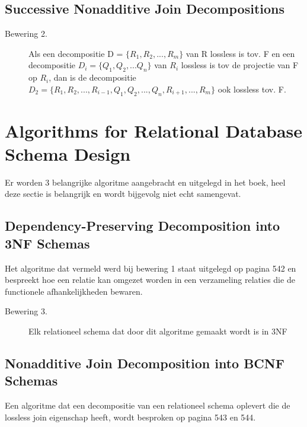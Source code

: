 				\subsection{Successive Nonadditive Join Decompositions}
				
					\begin{description}
						\item[Bewering 2. ] Als een decompositie D = $\lbrace R_1, R_2, ..., R_m \rbrace$ van R lossless is tov. F en een decompositie $D_i = \lbrace Q_1, Q_2, ... Q_n 								\rbrace$ van $R_i$ lossless is tov de projectie van F op $R_i$, dan is de decompositie $D_2 = \lbrace R_1, R_2, ..., R_{i-1}, Q_1, Q_2, ..., Q_n, R_{i+1}, ..., R_m 							\rbrace$ ook lossless tov. F.
					\end{description}
					
			\section{Algorithms for Relational Database Schema Design}
			
				Er worden 3 belangrijke algoritme aangebracht en uitgelegd in het boek, heel deze sectie is belangrijk en wordt bijgevolg niet echt samengevat.
			
				\subsection{Dependency-Preserving Decomposition into 3NF Schemas}
				
					Het algoritme dat vermeld werd bij bewering 1 staat uitgelegd op pagina 542 en bespreekt hoe een relatie kan omgezet worden in een verzameling relaties die de 									functionele afhankelijkheden bewaren.
					
					\begin{description}
						\item[Bewering 3. ] Elk relationeel schema dat door dit algoritme gemaakt wordt is in 3NF
					\end{description}
					
				\subsection{Nonadditive Join Decomposition into BCNF Schemas}
					
					Een algoritme dat een decompositie van een relationeel schema oplevert die de lossless join eigenschap heeft, wordt besproken op pagina 543 en 544.
					
